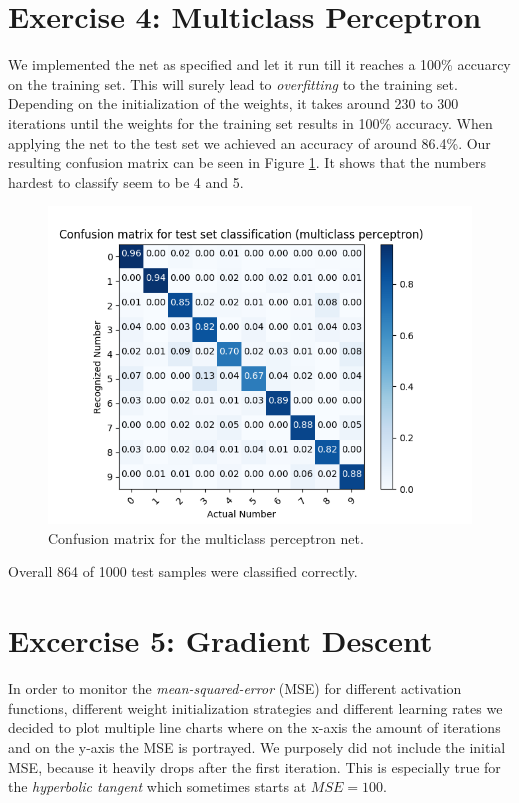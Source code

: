 \documentclass{article}
\begin{document}
\section{Exercise 4: Multiclass Perceptron}
We implemented the net as specified and let it run till it reaches a 100\% accuarcy on the training set.
This will surely lead to \emph{overfitting} to the training set.
Depending on the initialization of the weights, it takes around 230 to 300 iterations until the weights for the training set results in 100\% accuracy.
When applying the net to the test set we achieved an accuracy of around 86.4\%.
Our resulting confusion matrix can be seen in Figure \ref{fig:cmperceptron}. It shows that the numbers hardest to classify seem to be 4 and 5.
\begin{figure}[H]
\centering
\includegraphics[width=0.9\linewidth]{img/4/cm_multi_class_perceptron.png}
\caption{Confusion matrix for the multiclass perceptron net.}
\label{fig:cmperceptron}
\end{figure}

Overall 864 of 1000 test samples were classified correctly.


\section{Excercise 5: Gradient Descent}
In order to monitor the \emph{mean-squared-error} (MSE) for different activation functions, different weight initialization strategies and different learning rates we decided to plot multiple line charts where on the x-axis the amount of iterations and on the y-axis the MSE is portrayed.
We purposely did not include the initial MSE, because it heavily drops after the first iteration.
This is especially true for the \emph{hyperbolic tangent} which sometimes starts at $MSE=100$.
\end{document}

